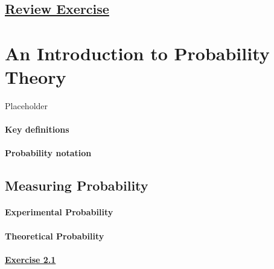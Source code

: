 \documentclass[
  11pt,
]{book}
\begin{document}
\section*{\texorpdfstring{\hyperref[re1a]{Review Exercise}}{Review Exercise}}\label{review-exercise}

\chapter{An Introduction to Probability Theory}\label{an-introduction-to-probability-theory}

Placeholder

\subsubsection*{Key definitions}\label{key-definitions}

\subsubsection*{Probability notation}\label{probability-notation}

\section{Measuring Probability}\label{measuring-probability}

\subsubsection*{Experimental Probability}\label{experimental-probability}

\subsubsection*{Theoretical Probability}\label{theoretical-probability}

\subsubsection*{\texorpdfstring{\hyperref[ex21a]{Exercise 2.1}}{Exercise 2.1}}\label{exercise-2.1}
\end{document}
